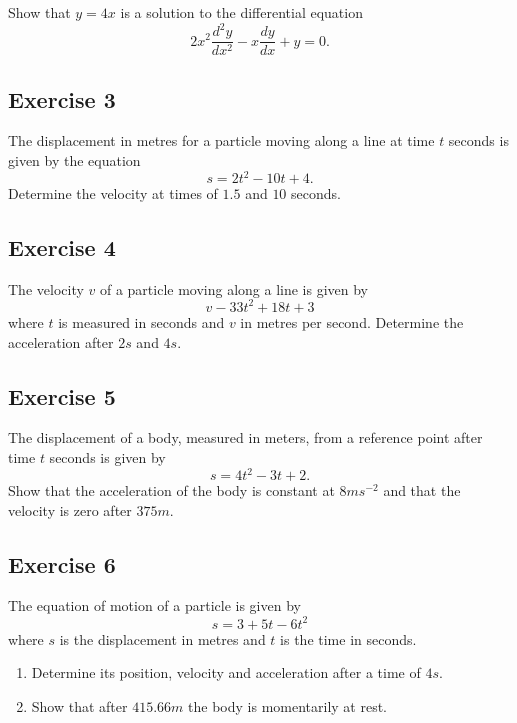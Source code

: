 \documentclass[
  11pt,
  oneside]{book}
\providecommand{\tightlist}{%
  \setlength{\itemsep}{0pt}\setlength{\parskip}{0pt}}
\newcommand{\slide}{}
\theoremstyle{definition}
\theoremstyle{definition}
\theoremstyle{definition}
\theoremstyle{definition}
\theoremstyle{remark}
\begin{document}
Show that \(y=4x\) is a solution to the differential equation
\[
2x^2\frac{d^2y}{dx^2}-x\frac{dy}{dx}+y=0.
\]

\slide

\subsection*{Exercise 3}\label{exercise-3-1}

The displacement in metres for a particle moving along a line at time \(t\) seconds is given by the equation
\[
s=2t^2-10t+4.
\]
Determine the velocity at times of \(1.5\) and \(10\) seconds.

\slide

\subsection*{Exercise 4}\label{exercise-4-1}

The velocity \(v\) of a particle moving along a line is given by
\[
v-33t^2+18t+3
\]
where \(t\) is measured in seconds and \(v\) in metres per second. Determine the acceleration after \(2s\) and \(4s\).
\slide

\subsection*{Exercise 5}\label{exercise-5}

The displacement of a body, measured in meters, from a reference point after time \(t\) seconds is given by
\[
s=4t^2-3t+2.
\]
Show that the acceleration of the body is constant at \(8ms^{-2}\) and that the velocity is zero after \(375m\).
\slide

\subsection*{Exercise 6}\label{exercise-6}

The equation of motion of a particle is given by
\[
s=3+5t-6t^2
\]
where \(s\) is the displacement in metres and \(t\) is the time in seconds.

\begin{enumerate}
\def\labelenumi{\alph{enumi}.}
\tightlist
\item
  Determine its position, velocity and acceleration after a time of \(4s\).
\item
  Show that after \(415.66m\) the body is momentarily at rest.
\end{enumerate}
\end{document}
